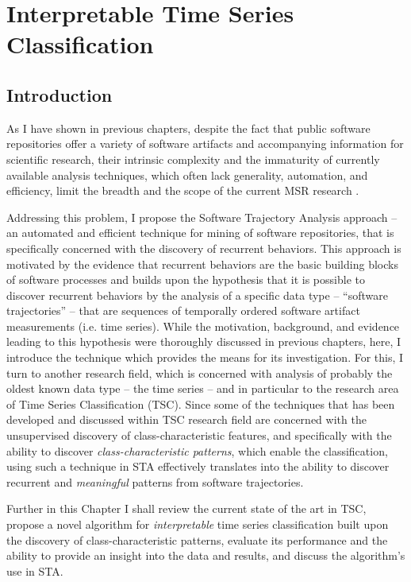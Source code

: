 \chapter{Interpretable Time Series Classification}\label{chapter_sax_vsm}

\section{Introduction}
As I have shown in previous chapters, despite the fact that public software repositories offer a variety of software 
artifacts and accompanying information for scientific research, their intrinsic complexity and the immaturity of 
currently available analysis techniques, which often lack generality, automation, and efficiency, limit the breadth 
and the scope of the current MSR research \cite{citeulike:7853299} \cite{citeulike:12550438}.

Addressing this problem, I propose the Software Trajectory Analysis approach -- an automated and efficient technique
for mining of software repositories, that is specifically concerned with the discovery of recurrent behaviors.
This approach is motivated by the evidence that recurrent behaviors are the basic building blocks of software 
processes \cite{neal2012habits} \cite{1903} \cite{citeulike:13208461} and builds upon the hypothesis that it is 
possible to discover recurrent behaviors by the analysis of a specific data type -- ``software trajectories'' -- 
that are sequences of temporally ordered software artifact measurements (i.e. time series).
While the motivation, background, and evidence leading to this hypothesis were thoroughly discussed in 
previous chapters, here, I introduce the technique which provides the means for its investigation. 
For this, I turn to another research field, which is concerned with analysis of probably the oldest known 
data type -- the time series \cite{citeulike:1454223} -- and in particular to the research area of 
Time Series Classification (TSC). Since some of the techniques that has been developed and discussed 
within TSC research field are concerned with the unsupervised discovery of class-characteristic features, 
and specifically with the ability to discover \textit{class-characteristic patterns}, which enable the classification, 
using such a technique in STA effectively translates into the ability to discover recurrent and \textit{meaningful} 
patterns from software trajectories. 

Further in this Chapter I shall review the current state of the art in TSC, 
propose a novel algorithm for \textit{interpretable} time series classification built upon the discovery of 
class-characteristic patterns, evaluate its performance and the ability to provide an insight into the data and results, 
and discuss the algorithm's use in STA.

